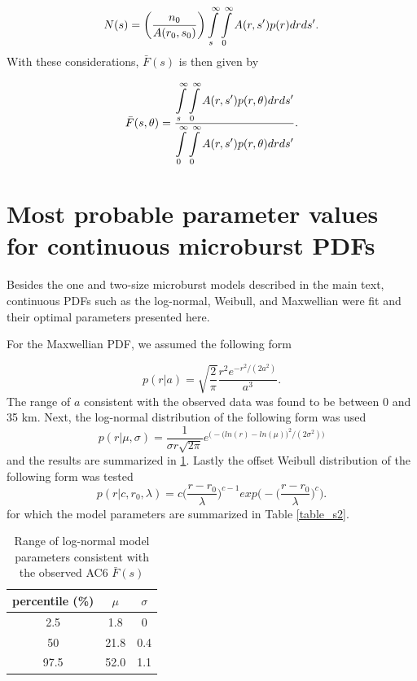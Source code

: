 \documentclass[draft]{agujournal2019}
\begin{document}
\begin{equation}
N(s) = \bigg( \frac{n_0}{A(r_0, s_0)} \bigg) \displaystyle\int\displaylimits_{s}^{\infty} \displaystyle\int\displaylimits_0^{\infty} A(r, s') p(r) dr ds'.
\end{equation} With these considerations, $\bar{F}(s)$ is then given by 

\begin{equation} \label{analytic_integral}
\bar{F}(s, \theta) = \frac{\displaystyle\int\displaylimits_{s}^{\infty} \displaystyle\int\displaylimits_0^{\infty} A(r, s') p(r, \theta) dr ds'}{\displaystyle\int\displaylimits_{0}^{\infty} \displaystyle\int\displaylimits_0^{\infty} A(r, s') p(r, \theta) dr ds'}.
\end{equation}

\section{Most probable parameter values for continuous microburst PDFs} \label{appendixc}
Besides the one and two-size microburst models described in the main text, continuous PDFs such as the log-normal, Weibull, and Maxwellian were fit and their optimal parameters presented here.

For the Maxwellian PDF, we assumed the following form

\begin{equation}
p(r | a) = \sqrt{\frac{2}{\pi}} \frac{r^2 e^{-r^2/(2a^2)}}{a^3}.
\end{equation} The range of $a$ consistent with the observed data was found to be between 0 and 35 km. Next, the log-normal distribution of the following form was used
\begin{equation}
p(r | \mu, \sigma) = \frac{1}{\sigma r \sqrt{2 \pi}} e^{\Big( -\big( ln(r) - ln(\mu) \big)^2/(2 \sigma^2) \Big)}
\end{equation} and the results are summarized in \ref{table_s1}. Lastly the offset Weibull distribution of the following form was tested
\begin{equation}
p(r | c, r_0, \lambda) = c \bigg(\frac{r-r_0}{\lambda}\bigg)^{c-1} exp \Bigg(- \bigg(\frac{r-r_0}{\lambda}\bigg)^{c} \Bigg).
\end{equation} for which the model parameters are summarized in Table \ref{table_s2}.

\begin{table}[h]
\caption{Range of log-normal model parameters consistent with the observed AC6  $\bar{F}(s)$}
\label{table_s1}
\centering
\begin{tabular}{|c|c|c|}
\hline 
percentile (\%) & $\mu$ & $\sigma$ \\ 
\hline 
2.5 & 1.8 & 0 \\ 
\hline 
50 & 21.8 & 0.4 \\ 
\hline 
97.5 & 52.0 & 1.1 \\ 
\hline 
\end{tabular} 
\end{table}
\end{document}
